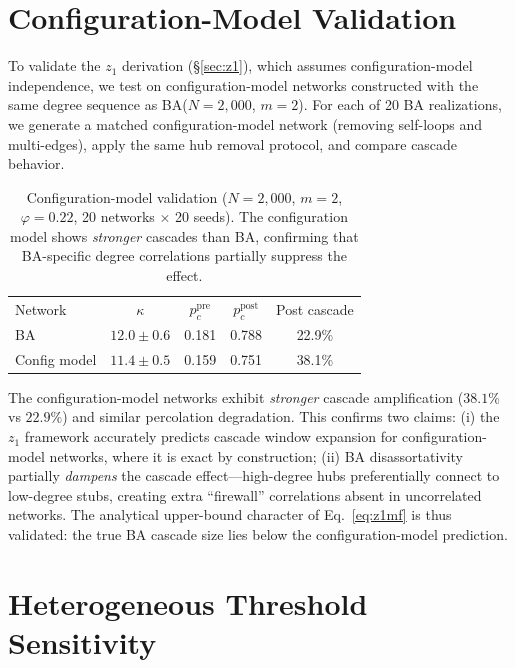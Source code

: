 \documentclass[aps,pre,twocolumn,superscriptaddress,showpacs]{revtex4-2}
\newcommand{\pc}{p_c}
\begin{document}
\section{Configuration-Model Validation}
\label{app:config}

To validate the $z_1$ derivation (\S\ref{sec:z1}), which assumes configuration-model independence, we test on configuration-model networks constructed with the same degree sequence as BA($N=2{,}000$, $m=2$). For each of 20 BA realizations, we generate a matched configuration-model network (removing self-loops and multi-edges), apply the same hub removal protocol, and compare cascade behavior.

\begin{table}[h]
\caption{Configuration-model validation ($N=2{,}000$, $m=2$, $\varphi=0.22$, 20 networks $\times$ 20 seeds). The configuration model shows \emph{stronger} cascades than BA, confirming that BA-specific degree correlations partially suppress the effect.}
\label{tab:config}
\begin{ruledtabular}
\begin{tabular}{lcccc}
\textrm{Network} & $\kappa$ & $\pc^{\mathrm{pre}}$ & $\pc^{\mathrm{post}}$ & \textrm{Post cascade} \\
\colrule
BA & $12.0 \pm 0.6$ & 0.181 & 0.788 & 22.9\% \\
Config model & $11.4 \pm 0.5$ & 0.159 & 0.751 & 38.1\% \\
\end{tabular}
\end{ruledtabular}
\end{table}

The configuration-model networks exhibit \emph{stronger} cascade amplification ($38.1\%$ vs $22.9\%$) and similar percolation degradation. This confirms two claims: (i) the $z_1$ framework accurately predicts cascade window expansion for configuration-model networks, where it is exact by construction; (ii) BA disassortativity partially \emph{dampens} the cascade effect---high-degree hubs preferentially connect to low-degree stubs, creating extra ``firewall'' correlations absent in uncorrelated networks. The analytical upper-bound character of Eq.~\ref{eq:z1mf} is thus validated: the true BA cascade size lies below the configuration-model prediction.

\section{Heterogeneous Threshold Sensitivity}
\label{app:hetero}
\end{document}
